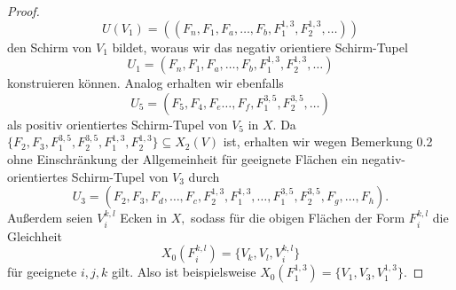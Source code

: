 \documentclass[12pt,titlepage,twoside,cleardoublepage]{article}
\theoremstyle{nummermitklammern}
\numberwithin{equation}{section}
\begin{document}
\begin{proof}
\[
U(V_1)=((F_n,F_1,F_a,\ldots,F_b,F^{1,3}_1,F^{1,3}_2,\ldots))
\]
den Schirm von $V_1$ bildet, woraus wir das negativ orientiere Schirm-Tupel
\[
U_1=(F_n,F_1,F_a,\ldots,F_b,F^{1,3}_1,F^{1,3}_2,\ldots)
\]  
konstruieren können.
Analog erhalten wir ebenfalls 
\[
U_5=(F_5,F_4,F_e\ldots,F_f,F^{3,5}_1,F^{3,5}_2,\ldots)
\] als positiv orientiertes Schirm-Tupel von $V_5$ in $X$. Da $\{F_2,F_3,F_1^{3,5},F_2^{3,5},F^{1,3}_1,F^{1,3}_2\}\subseteq X_2(V)$ ist,  erhalten wir wegen Bemerkung 0.2 ohne Einschränkung der Allgemeinheit für geeignete Flächen ein negativ-orientiertes Schirm-Tupel von $V_3$ durch
\[
U_3=(F_2,F_3,F_d,\ldots,F_c,F^{1,3}_2,F^{1,3}_1,\ldots,F_1^{3,5},F_2^{3,5},F_g,\ldots,F_h).
\]
Außerdem seien $V_i^{k,l}$ Ecken in $X,$ sodass für die obigen Flächen der Form $F_i^{k,l}$ die Gleichheit
\[
X_0(F^{k,l}_i)=\{V_k,V_l,V_i^{k,l}\}
\] für geeignete $i,j,k$ gilt. Also ist beispielsweise $X_0(F_1^{1,3})=\{V_1,V_3,V_1^{1,3}\}.$



\end{proof}
\end{document}
